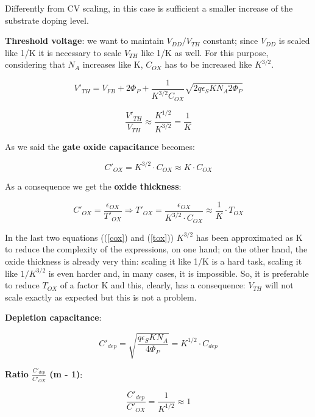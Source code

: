 \documentclass[a4paper, 12pt, twoside, openright]{report}
\begin{document}
{{{Differently from CV scaling, in this case is sufficient a smaller increase of the substrate doping level.

\textbf{Threshold voltage}: we want to maintain $V_{DD}/V_{TH}$ constant; since $V_{DD}$ is scaled like 1/K it is necessary to scale $V_{TH}$ like 1/K as well. For this purpose, considering that $N_{A}$ increases like K, $C_{OX}$ has to be increased like $K^{3/2}$.

	\begin{equation}
	V'_{TH} = V_{FB} + 2\Phi_P + \frac{1}{K^{3/2} C_{OX}} \sqrt{2q \epsilon_S K N_A 2\Phi_P}
	\end{equation}
	
	\begin{equation}
	\frac{V'_{TH}}{V_{TH}} \approx \frac{K^{1/2}} {K^{3/2}} = \frac{1}{K}
	\end{equation}

As we said the \textbf{gate oxide capacitance} becomes:

	\begin{equation}
	C'_{OX} = K^{3/2} \cdot C_{OX}  \approx K \cdot C_{OX}
	\label{cox}
	\end{equation}

As a consequence we get the \textbf{oxide thickness}:

	\begin{equation}
	C'_{OX} = \frac{\epsilon_{OX}}{T'_{OX}} \Rightarrow T'_{OX} = \frac{\epsilon_{OX}}{K^{3/2} \cdot C_{OX}} \approx \frac{1}{K} \cdot T_{OX}
	\label{tox}
	\end{equation}

In the last two equations ((\ref{cox}) and (\ref{tox})) $K^{3/2}$ has been approximated as K to reduce the complexity of the expressions, on one hand; on the other hand, the oxide thickness is already very thin: scaling it like 1/K is a hard task, scaling it like $1/K^{3/2}$ is even harder and, in many cases, it is impossible. So, it is preferable to reduce $T_{OX}$ of a factor K and this, clearly, has a consequence: $V_{TH}$ will not scale exactly as expected but this is not a problem.

\textbf{Depletion capacitance}:

	\begin{equation}
	C'_{dep} = \sqrt{\frac{q \epsilon_S K N_A}{4 \Phi_P}} = K^{1/2} \cdot C_{dep} 
	\label{}
	\end{equation}

\textbf{Ratio $\frac{C'_{dep}}{C'_{OX} }$ (m - 1)}:

	\begin{equation}
	\frac{C'_{dep}}{C'_{OX}} = \frac{1}{K^{1/2}} \approx 1
	\label{}
	\end{equation}

}}}
\end{document}
